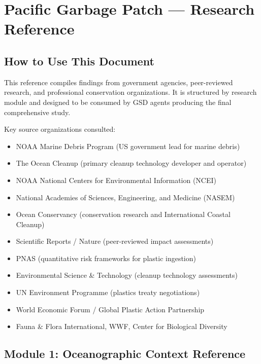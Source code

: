 \documentclass[11pt,letterpaper]{article}
\newcommand{\stageheader}[2]{%
  \noindent\colorbox{#2}{\makebox[\textwidth][l]{%
    \textcolor{white}{\bfseries\sffamily\hspace{6pt}#1\hspace{6pt}}}}%
  \vspace{0.5em}\par%
}
\begin{document}
\newpage

\stageheader{STAGE 2 --- RESEARCH REFERENCE}{secondary}

\section{Pacific Garbage Patch --- Research Reference}

\subsection{How to Use This Document}

This reference compiles findings from government agencies, peer-reviewed research, and professional conservation organizations. It is structured by research module and designed to be consumed by GSD agents producing the final comprehensive study.

Key source organizations consulted:
\begin{itemize}[leftmargin=2em]
\item NOAA Marine Debris Program (US government lead for marine debris)
\item The Ocean Cleanup (primary cleanup technology developer and operator)
\item NOAA National Centers for Environmental Information (NCEI)
\item National Academies of Sciences, Engineering, and Medicine (NASEM)
\item Ocean Conservancy (conservation research and International Coastal Cleanup)
\item Scientific Reports / Nature (peer-reviewed impact assessments)
\item PNAS (quantitative risk frameworks for plastic ingestion)
\item Environmental Science \& Technology (cleanup technology assessments)
\item UN Environment Programme (plastics treaty negotiations)
\item World Economic Forum / Global Plastic Action Partnership
\item Fauna \& Flora International, WWF, Center for Biological Diversity
\end{itemize}

\subsection{Module 1: Oceanographic Context Reference}
\end{document}
